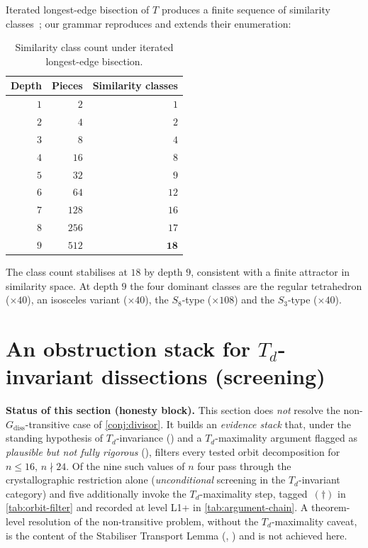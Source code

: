 \documentclass[11pt,a4paper]{article}
\theoremstyle{plain}
\theoremstyle{definition}
\theoremstyle{remark}
\newcommand{\Td}{T_{\!d}}
\begin{document}
Iterated longest-edge bisection of $T$ produces a finite sequence of
similarity classes~\cite{PPS2023}; our grammar reproduces and
extends their enumeration:

\begin{table}[H]
\centering\small
\caption{Similarity class count under iterated longest-edge bisection.}
\label{tab:pps23}
\begin{tabular}{@{} r r r @{}}
\toprule
Depth & Pieces & Similarity classes \\
\midrule
$1$  & $2$   & $1$ \\
$2$  & $4$   & $2$ \\
$3$  & $8$   & $4$ \\
$4$  & $16$  & $8$ \\
$5$  & $32$  & $9$ \\
$6$  & $64$  & $12$ \\
$7$  & $128$ & $16$ \\
$8$  & $256$ & $17$ \\
$9$  & $512$ & $\mathbf{18}$ \\
\bottomrule
\end{tabular}
\end{table}

The class count stabilises at $18$ by depth $9$, consistent with a finite
attractor in similarity space.  At depth $9$ the four dominant classes are
the regular tetrahedron ($\times 40$), an isosceles variant ($\times 40$),
the $S_{8}$-type ($\times 108$) and the $S_{3}$-type ($\times 40$).

\section{An obstruction stack for $\Td$-invariant dissections
(screening)}\label{sec:nontrans}

\noindent\textbf{Status of this section (honesty block).}  This section
does \emph{not} resolve the non-$G_{\mathrm{diss}}$-transitive case of
\cref{conj:divisor}.  It builds an \emph{evidence stack} that, under the
standing hypothesis of $\Td$-invariance () and a
$\Td$-maximality argument flagged as \emph{plausible but not fully
rigorous} (), filters every tested
orbit decomposition for $n \leq 16$, $n \nmid 24$.  Of the nine such
values of $n$ four pass through the crystallographic restriction alone
(\emph{unconditional} screening in the $\Td$-invariant category) and five
additionally invoke the $\Td$-maximality step, tagged~$(\dagger)$ in
\cref{tab:orbit-filter} and recorded at level \textsf{L1+} in
\cref{tab:argument-chain}.  A theorem-level resolution of the
non-transitive problem, without the $\Td$-maximality caveat, is the
content of the Stabiliser Transport Lemma
(, ) and is not achieved
here.
\end{document}
